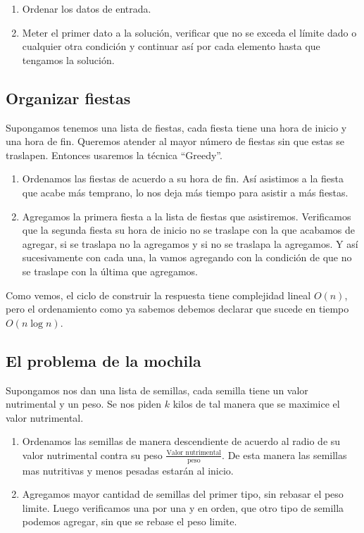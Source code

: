 \begin{enumerate}
    \item Ordenar los datos de entrada.
    \item Meter el primer dato a la solución, verificar que no se exceda el límite dado o cualquier otra condición y continuar así por cada elemento hasta que tengamos la solución.
\end{enumerate}

\subsection{Organizar fiestas}

Supongamos tenemos una lista de fiestas, cada fiesta tiene una hora de inicio y una hora de fin. Queremos atender al mayor número de fiestas sin que estas se traslapen. Entonces usaremos la técnica ``Greedy''.

\begin{enumerate}
    \item Ordenamos las fiestas de acuerdo a su hora de fin. Así asistimos a la fiesta que acabe más temprano, lo nos deja más tiempo para asistir a más fiestas.
    \item Agregamos la primera fiesta a la lista de fiestas que asistiremos. Verificamos que la segunda fiesta su hora de inicio no se traslape con la que acabamos de agregar, si se traslapa no la agregamos y si no se traslapa la agregamos. Y así sucesivamente con cada una, la vamos agregando con la condición de que no se traslape con la última que agregamos.
\end{enumerate}

Como vemos, el ciclo de construir la respuesta tiene complejidad lineal $O(n)$, pero el ordenamiento como ya sabemos debemos declarar que sucede en tiempo $O(n \log n)$.

\subsection{El problema de la mochila}

Supongamos nos dan una lista de semillas, cada semilla tiene un valor nutrimental y un peso. Se nos piden $k$ kilos de tal manera que se maximice el valor nutrimental.

\begin{enumerate}
    \item Ordenamos las semillas de manera descendiente de acuerdo al radio de su valor nutrimental contra su peso $\frac{\text{Valor nutrimental}}{\text{peso}}$. De esta manera las semillas mas nutritivas y menos pesadas estarán al inicio. 
    \item Agregamos mayor cantidad de semillas del primer tipo, sin rebasar el peso limite. Luego verificamos una por una y en orden, que otro tipo de semilla podemos agregar, sin que se rebase el peso limite.
\end{enumerate}

